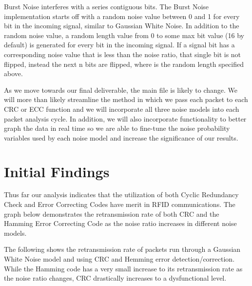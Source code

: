 \documentclass{sigcomm-alternate}
\begin{document}
Burst Noise interferes with a series contiguous bits. The Burst Noise implementation starts off with a random noise value between 0 and 1 for every bit in the incoming signal, similar to Gaussian White Noise. In addition to the random noise value, a random length value from 0 to some max bit value (16 by default) is generated for every bit in the incoming signal. If a signal bit has a corresponding noise value that is less than the noise ratio, that single bit is not flipped, instead the next n bits are flipped, where is the random length specified above.

As we move towards our final deliverable, the main file is likely to change. We will more than likely streamline the method in which we pass each packet to each CRC or ECC function and we will incorporate all three noise models into each packet analysis cycle. In addition, we will also incorporate functionality to better graph the data in real time so we are able to fine-tune the noise probability variables used by each noise model and increase the significance of our results.

\section{Initial Findings}
Thus far our analysis indicates that the utilization of both Cyclic Redundancy Check and Error Correcting Codes have merit in RFID communications. The graph below demonstrates the retransmission rate of both CRC and the Hamming Error Correcting Code as the noise ratio increases in different noise models.

The following shows the retransmission rate of packets run through a Gaussian White Noise model and using CRC and Hemming error detection/correction. While the Hamming code has a very small increase to its retransmission rate as the noise ratio changes, CRC drastically increases to a dysfunctional level.\\

 \\
\end{document}
